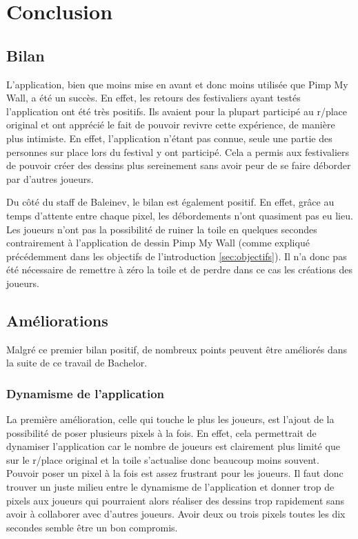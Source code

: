 \section{Conclusion}

\subsection{Bilan}

L'application, bien que moins mise en avant et donc moins utilisée que Pimp My Wall, a été un succès. En effet, les retours des festivaliers ayant testés l'application ont été très positifs. Ils avaient pour la plupart participé au r/place original et ont apprécié le fait de pouvoir revivre cette expérience, de manière plus intimiste. En effet, l'application n'étant pas connue, seule une partie des personnes sur place lors du festival y ont participé. Cela a permis aux festivaliers de pouvoir créer des dessins plus sereinement sans avoir peur de se faire déborder par d'autres joueurs.

Du côté du staff de Baleinev, le bilan est également positif. En effet, grâce au temps d'attente entre chaque pixel, les débordements n'ont quasiment pas eu lieu. Les joueurs n'ont pas la possibilité de ruiner la toile en quelques secondes contrairement à l'application de dessin Pimp My Wall (comme expliqué précédemment dans les objectifs de l'introduction \ref{sec:objectifs}). Il n'a donc pas été nécessaire de remettre à zéro la toile et de perdre dans ce cas les créations des joueurs.

\subsection{Améliorations}
\label{poc-ameliorations}

Malgré ce premier bilan positif, de nombreux points peuvent être améliorés dans la suite de ce travail de Bachelor.

\subsubsection{Dynamisme de l'application}
La première amélioration, celle qui touche le plus les joueurs, est l'ajout de la possibilité de poser plusieurs pixels à la fois. En effet, cela permettrait de dynamiser l'application car le nombre de joueurs est clairement plus limité que sur le r/place original et la toile s'actualise donc beaucoup moins souvent. Pouvoir poser un pixel à la fois est assez frustrant pour les joueurs. Il faut donc trouver un juste milieu entre le dynamisme de l'application et donner trop de pixels aux joueurs qui pourraient alors réaliser des dessins trop rapidement sans avoir à collaborer avec d'autres joueurs. Avoir deux ou trois pixels toutes les dix secondes semble être un bon compromis.

